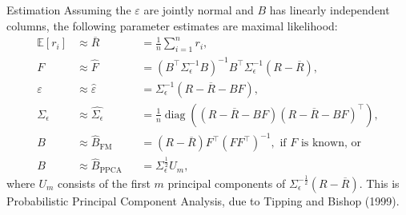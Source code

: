 \documentclass{beamer}
\DeclareMathOperator{\diag}{diag}
\begin{document}
\begin{frame}{Estimation}
	Assuming the $\varepsilon$ are jointly normal and $B$ has linearly independent columns, the following parameter estimates are maximal likelihood:
	\begin{align*}
		\mathbb{E}[r_i]		&\approx \overline{R}		&&= \frac{1}{n}\sum_{i=1}^n r_i,
	\\	F			&\approx \hat{F}		&&= (B^\top \Sigma_\epsilon^{-1} B)^{-1}B^\top \Sigma_\epsilon^{-1}(R-\overline{R}),
	\\	\varepsilon		&\approx \hat{\varepsilon}	&&= \Sigma_\epsilon^{-1} (R-\overline{R}-BF),
	\\	\Sigma_\epsilon		&\approx \hat{\Sigma_\epsilon}	&&= \frac{1}{n}\diag((R-\overline{R}-BF)(R-\overline{R}-BF)^\top),
	\\	B			&\approx \hat{B}_{\textrm{FM}}	&&= (R-\overline{R})F^\top (FF^\top)^{-1},\textrm{ if }F\textrm{ is known, or}%
	\\	B			&\approx \hat{B}_{\textrm{PPCA}}	&&= \Sigma_\epsilon^\frac{1}{2} U_m,%
	\end{align*}
	where $U_m$ consists of the first $m$ principal components of $\Sigma_\epsilon^{-\frac{1}{2}}(R-\overline{R})$. This is Probabilistic Principal Component Analysis, due to Tipping and Bishop (1999).
\end{frame}
\end{document}
